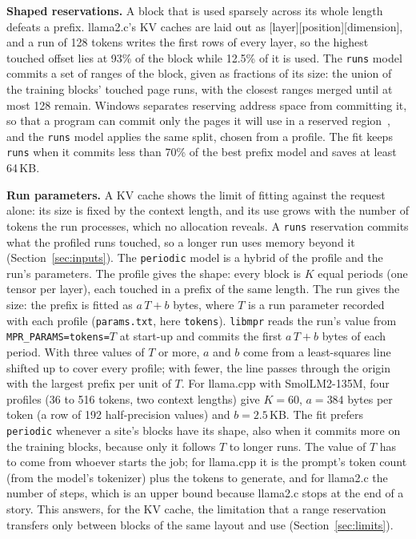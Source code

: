 \documentclass[11pt]{article}
\newcommand{\libmpr}{\texttt{libmpr}}
\newcommand{\secref}[1]{Section~\ref{#1}}
\begin{document}
\textbf{Shaped reservations.} A block that is used sparsely across its whole length defeats a prefix. llama2.c's
KV caches are laid out as [layer][position][dimension], and a run of 128 tokens writes the first rows of every
layer, so the highest touched offset lies at 93\% of the block while 12.5\% of it is used. The \texttt{runs}
model commits a set of ranges of the block, given as fractions of its size: the union of the training blocks'
touched page runs, with the closest ranges merged until at most 128 remain. Windows separates reserving address
space from committing it, so that a program can commit only the pages it will use in a reserved
region~\cite{MSVirtualAlloc}, and the \texttt{runs} model applies the same split, chosen from a profile. The fit
keeps \texttt{runs} when it commits less than 70\% of the best prefix model and saves at least 64\,KB.

\textbf{Run parameters.} A KV cache shows the limit of fitting against the request alone: its size is fixed by
the context length, and its use grows with the number of tokens the run processes, which no allocation reveals. A
\texttt{runs} reservation commits what the profiled runs touched, so a longer run uses memory beyond it
(\secref{sec:inputs}). The \texttt{periodic} model is a hybrid of the profile and the run's parameters. The
profile gives the shape: every block is $K$ equal periods (one tensor per layer), each touched in a prefix of
the same length. The run gives the size: the prefix is fitted as $a\,T + b$ bytes, where $T$ is a run parameter
recorded with each profile (\texttt{params.txt}, here \texttt{tokens}). \libmpr{} reads the run's value from
\texttt{MPR\_PARAMS=tokens=}$T$ at start-up and commits the first $a\,T + b$ bytes of each period. With three
values of $T$ or more, $a$ and $b$ come from a least-squares line shifted up to cover every profile; with fewer, the
line passes through the origin with the largest prefix per unit of $T$. For llama.cpp with SmolLM2-135M, four
profiles (36 to 516 tokens, two context lengths) give $K = 60$, $a = 384$ bytes per token (a row of 192
half-precision values) and $b = 2.5$\,KB. The fit prefers \texttt{periodic} whenever a site's blocks have its
shape, also when it commits more on the training blocks, because only it follows $T$ to longer runs. The value of
$T$ has to come from whoever starts the job; for llama.cpp it is the prompt's token count (from the model's
tokenizer) plus the tokens to generate, and for llama2.c the number of steps, which is an upper bound because
llama2.c stops at the end of a story. This answers, for the KV cache, the limitation that a range reservation
transfers only between blocks of the same layout and use (\secref{sec:limits}).
\end{document}
